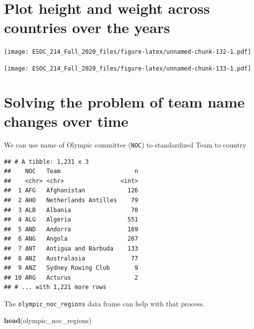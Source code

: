 \documentclass[
]{book}
\newenvironment{Shaded}{\begin{snugshade}}{\end{snugshade}}
\newcommand{\KeywordTok}[1]{\textcolor[rgb]{0.13,0.29,0.53}{\textbf{#1}}}
\newcommand{\NormalTok}[1]{#1}
\newcommand{\OperatorTok}[1]{\textcolor[rgb]{0.81,0.36,0.00}{\textbf{#1}}}
\newcommand{\StringTok}[1]{\textcolor[rgb]{0.31,0.60,0.02}{#1}}
\begin{document}
\hypertarget{plot-height-and-weight-across-countries-over-the-years}{%
\section{Plot height and weight across countries over the years}\label{plot-height-and-weight-across-countries-over-the-years}}

\texttt{[image: ESOC\_214\_Fall\_2020\_files/figure-latex/unnamed-chunk-132-1.pdf]}

\texttt{[image: ESOC\_214\_Fall\_2020\_files/figure-latex/unnamed-chunk-133-1.pdf]}

\hypertarget{solving-the-problem-of-team-name-changes-over-time}{%
\section{Solving the problem of team name changes over time}\label{solving-the-problem-of-team-name-changes-over-time}}

We can use name of Olympic committee (\texttt{NOC}) to standardized Team to country

\begin{Shaded}
\end{Shaded}

\begin{verbatim}
## # A tibble: 1,231 x 3
##    NOC   Team                     n
##    <chr> <chr>                <int>
##  1 AFG   Afghanistan            126
##  2 AHO   Netherlands Antilles    79
##  3 ALB   Albania                 70
##  4 ALG   Algeria                551
##  5 AND   Andorra                169
##  6 ANG   Angola                 267
##  7 ANT   Antigua and Barbuda    133
##  8 ANZ   Australasia             77
##  9 ANZ   Sydney Rowing Club       9
## 10 ARG   Acturus                  2
## # ... with 1,221 more rows
\end{verbatim}

The \texttt{olympic\_noc\_regions} data frame can help with that process.

\begin{Shaded}
\begin{Highlighting}[]
\KeywordTok{head}\NormalTok{(olympic_noc_regions)}
\end{Highlighting}
\end{Shaded}
\end{document}
